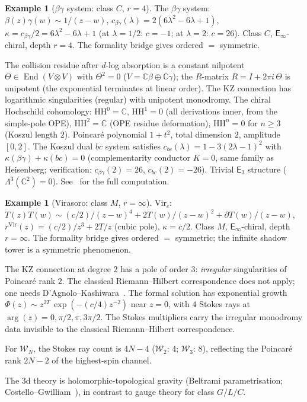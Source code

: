 \documentclass[11pt,reqno]{amsart}
\theoremstyle{definition}
\newtheorem{example}[theorem]{Example}
\theoremstyle{remark}
\newcommand{\cW}{\mathcal{W}}
\newcommand{\HH}{\mathrm{HH}}
\providecommand{\Ethree}{\mathsf{E}_{3}}
\newcommand{\Einf}{\mathsf{E}_{\infty}}
\DeclareMathOperator{\End}{End}
\newcommand{\CC}{\mathbb{C}}
\numberwithin{equation}{section}
\begin{document}
\begin{example}[$\beta\gamma$ system: class $C$, $r = 4$]
\label{ex:betagamma}
The $\beta\gamma$ system: $\beta(z)\gamma(w) \sim 1/(z-w)$,
$c_{\beta\gamma}(\lambda) = 2(6\lambda^2 - 6\lambda + 1)$,
$\kappa = c_{\beta\gamma}/2 = 6\lambda^2 - 6\lambda + 1$
(at $\lambda = 1/2$: $c = -1$; at $\lambda = 2$: $c = 26$).
Class $C$, $\Einf$-chiral, depth $r = 4$.
The formality bridge gives ordered $=$ symmetric.

The collision residue after $d$-log absorption is a constant
nilpotent $\Theta \in \End(V \otimes V)$ with $\Theta^2 = 0$
($V = \CC\beta \oplus \CC\gamma$); the $R$-matrix
$R = I + 2\pi i\,\Theta$ is unipotent (the exponential
terminates at linear order). The KZ connection has
logarithmic singularities (regular) with unipotent monodromy.
The chiral Hochschild cohomology:
$\HH^0 = \CC$, $\HH^1 = 0$ (all derivations inner, from the
simple-pole OPE), $\HH^2 = \CC$ (OPE residue deformation),
$\HH^n = 0$ for $n \geq 3$ (Koszul length $2$).
Poincar\'e polynomial $1 + t^2$, total dimension $2$,
amplitude $[0,2]$.
The Koszul dual $bc$ system satisfies
$c_{bc}(\lambda) = 1 - 3(2\lambda - 1)^2$ with
$\kappa(\beta\gamma) + \kappa(bc) = 0$
(complementarity conductor $K = 0$, same family as
Heisenberg; verification: $c_{\beta\gamma}(2) = 26$,
$c_{bc}(2) = -26$).
Trivial $\Ethree$ structure ($\Lambda^3(\CC^2) = 0$).
See~\cite[\S III.4]{Lorgat26I} for the full computation.
\end{example}

\begin{example}[Virasoro: class $M$, $r = \infty$]
\label{ex:virasoro}
$\mathrm{Vir}_c$: $T(z)T(w) \sim (c/2)/(z{-}w)^4
+ 2T(w)/(z{-}w)^2 + \partial T(w)/(z{-}w)$,
$r^{\mathrm{Vir}}(z) = (c/2)/z^3 + 2T/z$ (cubic pole),
$\kappa = c/2$.
Class $M$, $\Einf$-chiral, depth $r = \infty$.
The formality bridge gives ordered $=$ symmetric; the
infinite shadow tower is a symmetric phenomenon.

The KZ connection at degree $2$ has a pole of order $3$:
\emph{irregular} singularities of Poincar\'e rank $2$.
The classical Riemann--Hilbert correspondence does not apply;
one needs D'Agnolo--Kashiwara~\cite{DAgnoloKashiwara16}.
The formal solution has exponential growth
$\Phi(z) \sim z^{2T}\,\exp(-(c/4)z^{-2})$ near $z = 0$,
with $4$ Stokes rays at $\arg(z) = 0, \pi/2, \pi, 3\pi/2$.
The Stokes multipliers carry the irregular monodromy data
invisible to the classical Riemann--Hilbert correspondence.

For $\cW_N$, the Stokes ray count is $4N - 4$
($\cW_2$: $4$; $\cW_3$: $8$), reflecting the Poincar\'e
rank $2N - 2$ of the highest-spin channel.

The $3$d theory is holomorphic-topological gravity (Beltrami
parametrisation; Costello--Gwilliam~\cite{CG17}), in contrast
to gauge theory for class $G/L/C$.
\end{example}
\end{document}
